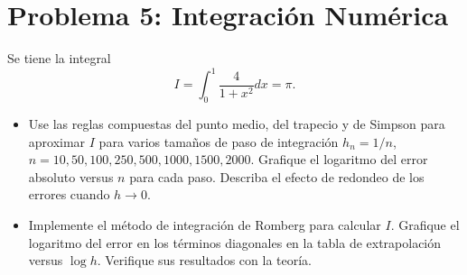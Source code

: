 
\section{Problema 5: Integración Numérica}
Se tiene la integral
\[
I = \int_0^1 \frac{4}{1 + x^2} dx = \pi.
\]

\begin{itemize}
    \item Use las reglas compuestas del punto medio, del trapecio y de Simpson para aproximar $I$ para varios tamaños de paso de integración $h_n = 1/n$, $n = 10, 50, 100, 250, 500, 1000, 1500, 2000$. Grafique el logaritmo del error absoluto versus $n$ para cada paso. Describa el efecto de redondeo de los errores cuando $h \to 0$.
    \item Implemente el método de integración de Romberg para calcular $I$. Grafique el logaritmo del error en los términos diagonales en la tabla de extrapolación versus $\log h$. Verifique sus resultados con la teoría.
\end{itemize}
